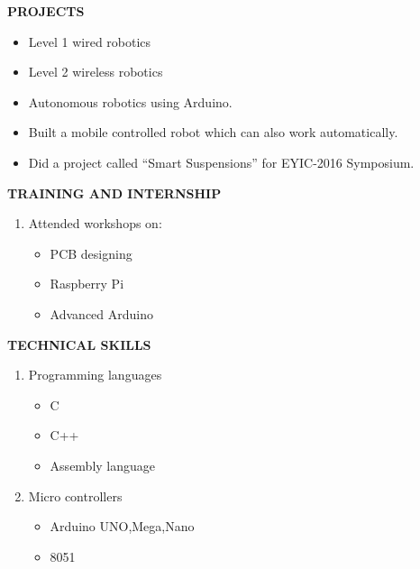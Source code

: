 \documentclass[a4paper]{article}
\begin{document}
\begin{flushleft}
\textbf {PROJECTS}\\
\begin{itemize}
\item	Level 1 wired robotics
\item	Level 2 wireless robotics
\item	Autonomous robotics using Arduino.
\item	Built a  mobile controlled robot which can also work automatically.
\item	Did a project called “Smart Suspensions” for EYIC-2016 Symposium.  
\end{itemize}
\end{flushleft}


\begin{flushleft}
\vspace{2in}
\textbf {TRAINING AND INTERNSHIP}\\
\begin{enumerate}
\item  	Attended workshops on:
\begin{itemize}
 \item PCB designing 
\item  Raspberry Pi
\item Advanced Arduino
\end{itemize}
\end{enumerate}
\end{flushleft}

\begin{flushleft}
\textbf {}
\end{flushleft}


\begin{flushleft}
\vspace{1in}\textbf {TECHNICAL SKILLS}\\
\begin{enumerate}
\item Programming languages
  \begin{itemize}
      \item C
      \item C++
      \item Assembly language
\end{itemize}
\item Micro controllers
\begin{itemize}
      \item Arduino UNO,Mega,Nano
       \item 8051
\end{itemize}
\end{enumerate}
\end{flushleft}
\end{document}
